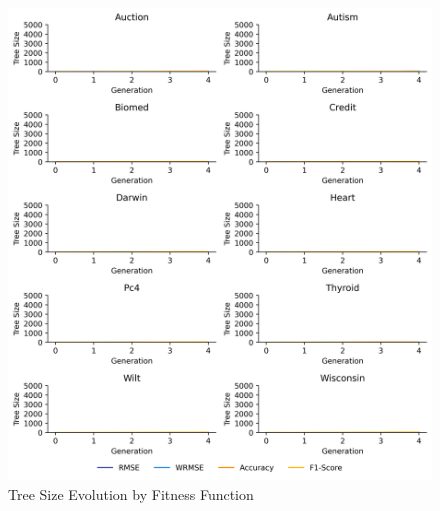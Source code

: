 
    \begin{figure}[H]
    \centering
    \includegraphics[width=\linewidth]{../Latex/Chapters/Figures/Results/fitness_test_tree_size_evolution.png}
    \caption{Tree Size Evolution by Fitness Function}
    \label{fig:fitness_test_tree_size_evolution}
    \end{figure}
    